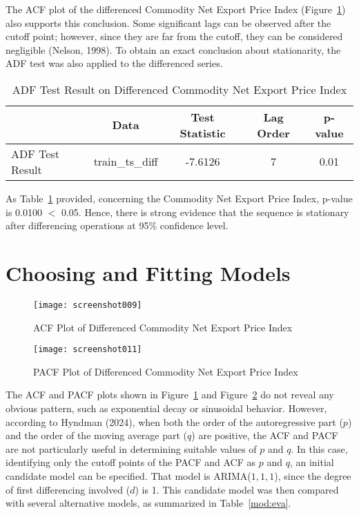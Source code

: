 \documentclass[12pt,a4paper]{report} %
\begin{document}
	The ACF plot of the differenced Commodity Net Export Price Index (Figure~\ref{fig:screenshot009}) also supports this conclusion. Some significant lags can be observed after the cutoff point; however, since they are far from the cutoff, they can be considered negligible (Nelson, 1998). To obtain an exact conclusion about stationarity, the ADF test was also applied to the differenced series.
	
	
	\begin{table}[h!]
		\centering
		\caption{ADF Test Result on Differenced Commodity Net Export Price Index}
		\label{tab:adfdiff}
		\begin{tabular}{l c c c c}
			\toprule
			& \textbf{Data} & \textbf{Test Statistic} & \textbf{Lag Order} & \textbf{p-value} \\
			\midrule
			ADF Test Result & train\_ts\_diff & -7.6126 & 7 & 0.01 \\
			\bottomrule
		\end{tabular}
	\end{table}
	
	
	As Table~\ref{tab:adfdiff} provided, concerning the Commodity Net Export Price Index, p-value is 0.0100 $<$ 0.05. Hence, there is strong evidence that the sequence is stationary after differencing operations at 95\% confidence level.
	
	\section{Choosing and Fitting Models}
	
	\begin{figure}[h!]
		\centering
		\texttt{[image: screenshot009]}
		\caption{ACF Plot of Differenced Commodity Net Export Price Index}
		\label{fig:screenshot009}
	\end{figure}
	
	\begin{figure}[h!]
		\centering
		\texttt{[image: screenshot011]}
		\caption{PACF Plot of Differenced Commodity Net Export Price Index}
		\label{fig:screenshot011}
	\end{figure}
	
	The ACF and PACF plots shown in Figure~\ref{fig:screenshot009} and Figure~\ref{fig:screenshot011} do not reveal any obvious pattern, such as exponential decay or sinusoidal behavior. However, according to Hyndman (2024), when both the order of the autoregressive part ($p$) and the order of the moving average part ($q$) are positive, the ACF and PACF are not particularly useful in determining suitable values of $p$ and $q$. In this case, identifying only the cutoff points of the PACF and ACF as $p$ and $q$, an initial candidate model can be specified. That model is ARIMA($1,1,1$), since the degree of first differencing involved ($d$) is 1. This candidate model was then compared with several alternative models, as summarized in Table~\ref{mod:eva}.
	
\end{document}
